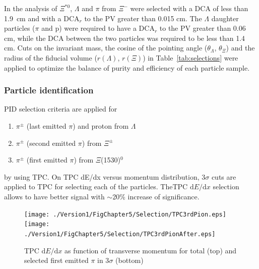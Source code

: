 In the analysis of $\Xi^{*0}$, $\Lambda$ and $\pi$ from $\Xi^{-}$ were 
selected with a DCA of less than 1.9~cm and with a DCA$_r$ to the PV greater than 0.015 cm. 
The $\Lambda$ daughter particles ($\pi$ and p) were required to have a DCA$_r$ to the PV greater 
than 0.06 cm, while the DCA between the two particles was required to be less than 1.4 cm. Cuts on 
the invariant mass, the cosine of the pointing angle ($\theta_\Lambda$, $\theta_\Xi$) and the radius of 
the fiducial volume ($r(\Lambda)$, $r(\Xi)$) in Table~\ref{tab:selections} were applied to optimize 
the balance of purity and efficiency of each particle sample. 


\newpage
\subsubsection{Particle identification}\label{sec:pPb:PID}
PID selection criteria are applied for
 
 \begin{enumerate}
\item $\pi^{\pm}$ (last emitted $\pi$) and proton from $\Lambda$
\item $\pi^{\pm}$ (second emitted $\pi$)   from $\Xi^{\pm}$
\item $\pi^{\pm}$ (first emitted $\pi$) from  $\Xi$(1530)$^{0}$
\end{enumerate}
 by using TPC. On TPC dE/dx versus momentum distribution, 3$\sigma$ cuts are applied to TPC for selecting each of the particles. TheTPC $\mathrm{d}E/\mathrm{d}x$ selection allows to have better signal with $\sim$20\% increase of significance. 
  
 
\begin{figure}[htbp]
\begin{center}
\texttt{[image: ./Version1/FigChapter5/Selection/TPC3rdPion.eps]}
\hspace{0.5cm}
\texttt{[image: ./Version1/FigChapter5/Selection/TPC3rdPionAfter.eps]}
\label{fig:TPCpionFirstEmitted} 
\caption{ TPC $\mathrm{d}E/\mathrm{d}x$ as function of transverse momentum for total (top) and selected first emitted $\pi$ in 3$\sigma$ (bottom) }
\end{center}
\end{figure}

